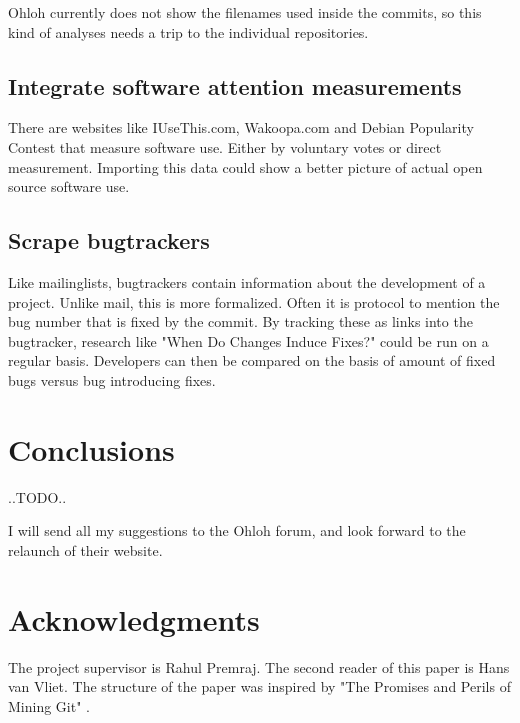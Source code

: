 \documentclass{sig-alternate}
\begin{document}
Ohloh currently does not show the filenames used inside the commits, so this kind of analyses needs a trip to the individual repositories.


\subsection{Integrate software attention measurements}
There are websites like IUseThis.com, Wakoopa.com and Debian Popularity Contest that measure software use. Either by voluntary votes or direct measurement. Importing this data could show a better picture of actual open source software use.


\subsection{Scrape bugtrackers}
Like mailinglists, bugtrackers contain information about the development of a project. Unlike mail, this is more formalized. Often it is protocol to mention the bug number that is fixed by the commit. By tracking these as links into the bugtracker, research like "When Do Changes Induce Fixes?" \cite{Liwerski:2005p4574} could be run on a regular basis. Developers can then be compared on the basis of amount of fixed bugs versus bug introducing fixes.


\section{Conclusions}

..TODO..

I will send all my suggestions to the Ohloh forum, and look forward to the relaunch of their website.


\section{Acknowledgments}
The project supervisor is Rahul Premraj. The second reader of this paper is Hans van Vliet. The structure of the paper was inspired by "The Promises and Perils of Mining Git" \cite{Bird:2009p4462}. 



\end{document}
